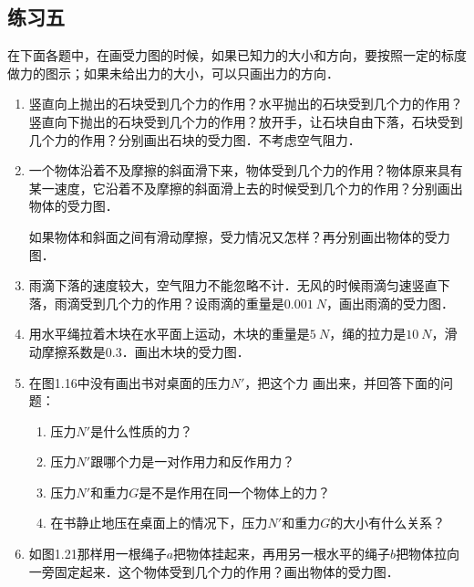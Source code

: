 \subsection*{练习五}
在下面各题中，在画受力图的时候，如果已知力的大小和方向，要按照一定的标度做力的图示；如果未给出力的大小，可以只画出力的方向．
\begin{enumerate}
    \item 竖直向上抛出的石块受到几个力的作用？水平抛出的石块受到几个力的作用？竖直向下抛出的石块受到几个力的作用？放开手，让石块自由下落，石块受到几个力的作用？分别画出石块的受力图．不考虑空气阻力．
    \item 一个物体沿着不及摩擦的斜面滑下来，物体受到几个力的作用？物体原来具有某一速度，它沿着不及摩擦的斜面滑上去的时候受到几个力的作用？分别画出物体的受力图．

          如果物体和斜面之间有滑动摩擦，受力情况又怎样？再分别画出物体的受力图．

    \item 雨滴下落的速度较大，空气阻力不能忽略不计．无风的时候雨滴匀速竖直下落，雨滴受到几个力的作用？设雨滴的重量是$\qty{0.001}{N}$，画出雨滴的受力图．
    \item 用水平绳拉着木块在水平面上运动，木块的重量是$\qty{5}{N}$，绳的拉力是$\qty{10}{N}$，滑动摩擦系数是0.3．画出木块的受力图．
    \item  在图1.16中没有画出书对桌面的压力$N'$，把这个力
          画出来，并回答下面的问题：
          \begin{enumerate}
              \item 压力$N'$是什么性质的力？
              \item 压力$N'$跟哪个力是一对作用力和反作用力？
              \item 压力$N'$和重力$G$是不是作用在同一个物体上的力？
              \item 在书静止地压在桌面上的情况下，压力$N'$和重力$G$的大小有什么关系？
          \end{enumerate}
    \item 如图1.21那样用一根绳子$a$把物体挂起来，再用另一根水平的绳子$b$把物体拉向一旁固定起来．这个物体受到几个力的作用？画出物体的受力图．
          \begin{figure}[H]
              \centering
              \caption{}
          \end{figure}

\end{enumerate}


